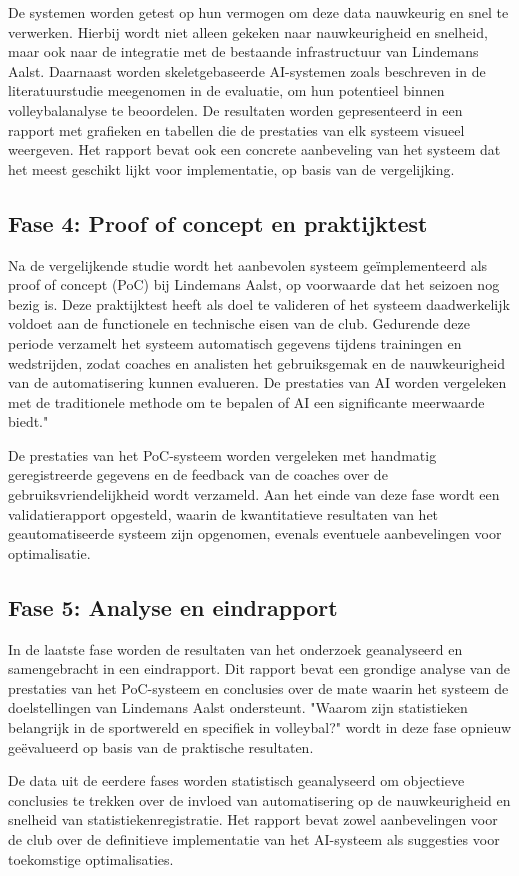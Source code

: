 De systemen worden getest op hun vermogen om deze data nauwkeurig en snel te verwerken. Hierbij wordt niet alleen gekeken naar nauwkeurigheid en snelheid, maar ook naar de integratie met de bestaande infrastructuur van Lindemans Aalst. Daarnaast worden skeletgebaseerde AI-systemen zoals beschreven in de literatuurstudie meegenomen in de evaluatie, om hun potentieel binnen volleybalanalyse te beoordelen. De resultaten worden gepresenteerd in een rapport met grafieken en tabellen die de prestaties van elk systeem visueel weergeven. Het rapport bevat ook een concrete aanbeveling van het systeem dat het meest geschikt lijkt voor implementatie, op basis van de vergelijking.
\subsection{Fase 4: Proof of concept en praktijktest}
Na de vergelijkende studie wordt het aanbevolen systeem geïmplementeerd als proof of concept (PoC) bij Lindemans Aalst, op voorwaarde dat het seizoen nog bezig is. Deze praktijktest heeft als doel te valideren of het systeem daadwerkelijk voldoet aan de functionele en technische eisen van de club. Gedurende deze periode verzamelt het systeem automatisch gegevens tijdens trainingen en wedstrijden, zodat coaches en analisten het gebruiksgemak en de nauwkeurigheid van de automatisering kunnen evalueren. De prestaties van AI worden vergeleken met de traditionele methode om te bepalen of AI een significante meerwaarde biedt."

De prestaties van het PoC-systeem worden vergeleken met handmatig geregistreerde gegevens en de feedback van de coaches over de gebruiksvriendelijkheid wordt verzameld. Aan het einde van deze fase wordt een validatierapport opgesteld, waarin de kwantitatieve resultaten van het geautomatiseerde systeem zijn opgenomen, evenals eventuele aanbevelingen voor optimalisatie.
\subsection{Fase 5: Analyse en eindrapport}
In de laatste fase worden de resultaten van het onderzoek geanalyseerd en samengebracht in een eindrapport. Dit rapport bevat een grondige analyse van de prestaties van het PoC-systeem en conclusies over de mate waarin het systeem de doelstellingen van Lindemans Aalst ondersteunt. "Waarom zijn statistieken belangrijk in de sportwereld en specifiek in volleybal?" wordt in deze fase opnieuw geëvalueerd op basis van de praktische resultaten.

De data uit de eerdere fases worden statistisch geanalyseerd om objectieve conclusies te trekken over de invloed van automatisering op de nauwkeurigheid en snelheid van statistiekenregistratie. Het rapport bevat zowel aanbevelingen voor de club over de definitieve implementatie van het AI-systeem als suggesties voor toekomstige optimalisaties.
